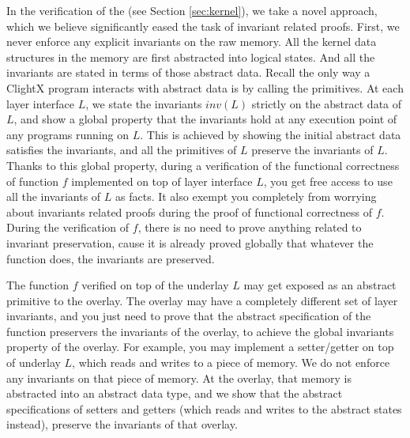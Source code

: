 {In the verification of the \mCTOS{} (see Section \ref{sec:kernel}),
we take a novel approach, which we believe significantly eased the task of invariant
related proofs. 
First, we never enforce any explicit invariants on the raw memory. All the kernel data
structures in the memory are first abstracted into logical states. And all the
invariants are stated in terms of those abstract data. Recall the only way
a ClightX program interacts with abstract data is by calling the primitives.
At each layer interface $L$, we state the invariants $inv(L)$ strictly on the abstract
data of $L$, and show a global property that the invariants hold at any execution
point of any programs running on $L$. This is achieved by showing the initial
abstract data satisfies the invariants, and all the primitives of $L$ preserve
the invariants of $L$. 
Thanks to this global property, during a verification of the functional correctness
of function $f$ implemented on top of layer interface $L$, you get free access to use all the invariants
of $L$ as facts. It also exempt you completely from worrying about invariants
related proofs during the proof of functional correctness of $f$.
During the verification of $f$, there is no need
to prove anything related to invariant preservation, cause it is already proved globally
that whatever the function does, the invariants are preserved.

The function $f$ verified on top of the underlay $L$ may get exposed as an abstract primitive to
the overlay. The overlay may have a completely different set of layer invariants,
and you just need to prove that the abstract specification of the function preservers
the invariants of the overlay, to achieve the global invariants property of the
overlay.
For example, you may implement a setter/getter on top of underlay $L$, which reads and writes to
a piece of memory. We do not enforce any invariants on that piece of memory. At the
overlay, that memory is abstracted into an abstract data type, and we show that
the abstract specifications of setters and getters (which reads and writes to the
abstract states instead), preserve the invariants of that overlay.

}
